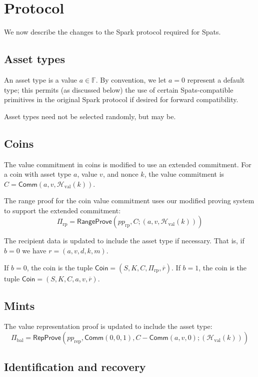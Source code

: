 \documentclass{article}
\newcommand{\F}{\mathbb{F}}
\newcommand{\func}[1]{\mathsf{#1}}
\newcommand{\comm}{\func{Comm}}
\newcommand{\hash}{\mathcal{H}}
\begin{document}
\section{Protocol}

We now describe the changes to the Spark protocol required for Spats.


\subsection{Asset types}

An asset type is a value $a \in \F$.
By convention, we let $a = 0$ represent a default type; this permits (as discussed below) the use of certain Spats-compatible primitives in the original Spark protocol if desired for forward compatibility.

Asset types need not be selected randomly, but may be.


\subsection{Coins}

The value commitment in coins is modified to use an extended commitment.
For a coin with asset type $a$, value $v$, and nonce $k$, the value commitment is $C = \comm(a, v, \hash_{\text{val}}(k))$.

The range proof for the coin value commitment uses our modified proving system to support the extended commitment:
$$\Pi_{\text{rp}} = \func{RangeProve}(pp_{\text{rp}}, C ; (a, v, \hash_{\text{val}}(k)))$$

The recipient data is updated to include the asset type if necessary.
That is, if $b = 0$ we have $r = (a, v, d, k, m)$.

If $b = 0$, the coin is the tuple $\func{Coin} = (S, K, C, \Pi_{\text{rp}}, \overline{r})$.
If $b = 1$, the coin is the tuple $\func{Coin} = (S, K, C, a, v, \overline{r})$.


\subsection{Mints}

The value representation proof is updated to include the asset type:
$$\Pi_{\text{bal}} = \func{RepProve}(pp_{\text{rep}}, \comm(0,0,1), C - \comm(a, v, 0) ; (\hash_{\text{val}}(k)))$$


\subsection{Identification and recovery}
\end{document}
